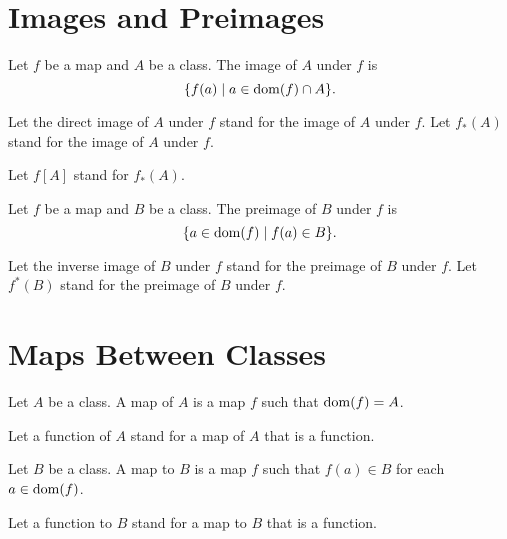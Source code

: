 \documentclass[10pt]{article}
\begin{document}
  \section{Images and Preimages}

  \begin{forthel}
    \begin{definition}
      Let $f$ be a map and $A$ be a class.
      The image of $A$ under $f$ is
      \[ \{ f(a) \mid a \in \operatorname{dom}(f) \cap A \}. \]
    \end{definition}

    Let the direct image of $A$ under $f$ stand for the image of $A$ under $f$.
    Let $f_{*}(A)$ stand for the image of $A$ under $f$.

    Let $f[A]$ stand for $f_{*}(A)$.
  \end{forthel}

  \begin{forthel}
    \begin{definition}
      Let $f$ be a map and $B$ be a class.
      The preimage of $B$ under $f$ is
      \[ \{ a \in \operatorname{dom}(f) \mid f(a) \in B \}. \]
    \end{definition}

    Let the inverse image of $B$ under $f$ stand for the preimage of $B$ under
    $f$.
    Let $f^{*}(B)$ stand for the preimage of $B$ under $f$.
  \end{forthel}


  \section{Maps Between Classes}

  \begin{forthel}
    \begin{definition}
      Let $A$ be a class.
      A map of $A$ is a map $f$ such that $\operatorname{dom}(f) = A$.
    \end{definition}

    Let a function of $A$ stand for a map of $A$ that is a function.
  \end{forthel}

  \begin{forthel}
    \begin{definition}
      Let $B$ be a class.
      A map to $B$ is a map $f$ such that $f(a) \in B$ for each $a \in \operatorname{dom}(f)$.
    \end{definition}

    Let a function to $B$ stand for a map to $B$ that is a function.
  \end{forthel}
\end{document}
